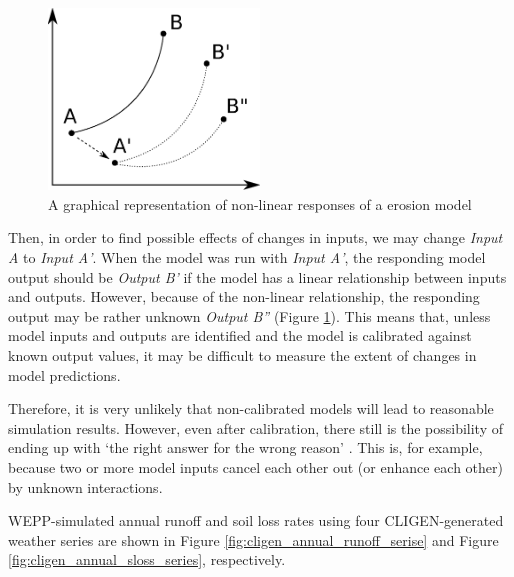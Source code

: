 \begin{figure}[htbp]
  \centering
    \includegraphics[width=0.5\textwidth]{./img/calibration}
  \caption{A graphical representation of non-linear responses of a erosion
model}
  \label{fig:calibration}
\end{figure}

Then, in order to find possible effects of changes in inputs, we may change
\emph{Input A} to \emph{Input A'}. When the model was run with \emph{Input A'},
the responding model output should be \emph{Output B'} if the model has a linear
relationship between inputs and outputs. However, because of the non-linear
relationship, the responding output may be rather unknown \emph{Output B''}
(Figure \ref{fig:calibration}). This means that, unless model inputs and outputs
are identified and the model is calibrated against known output values, it may
be difficult to measure the extent of changes in model predictions.

Therefore, it is very unlikely that non-calibrated models will lead to
reasonable simulation results. However, even after calibration, there still is
the possibility of ending up with `the right answer for the wrong reason'
\citep{favis-mortlock1994-use}. This is, for example, because two or more model
inputs cancel each other out (or enhance each other) by unknown interactions.

WEPP-simulated annual runoff and soil loss rates using four CLIGEN-generated
weather series are shown in Figure \ref{fig:cligen_annual_runoff_serise} and
Figure \ref{fig:cligen_annual_sloss_series}, respectively.

